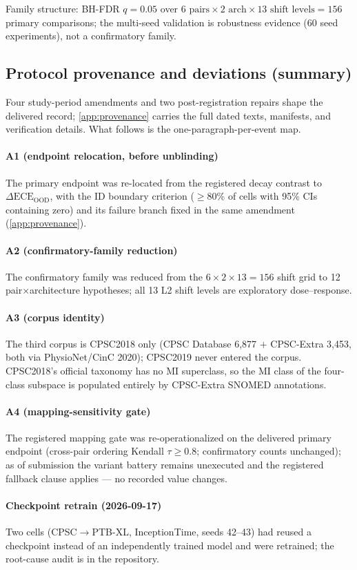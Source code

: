 \documentclass[review,12pt,nonatbib]{elsarticle}
\begin{document}
Family structure: BH-FDR $q=0.05$ over $6\text{ pairs}\times 2\text{ arch}\times 13\text{ shift levels}=156$
primary comparisons; the multi-seed validation is robustness evidence
(60 seed experiments), not a confirmatory family.

\subsection{Protocol provenance and deviations (summary)}
\label{sec:provenance-summary}
Four study-period amendments and two post-registration repairs shape the
delivered record; \ref{app:provenance} carries the full dated
texts, manifests, and verification details. What follows is the
one-paragraph-per-event map.
\paragraph{A1 (endpoint relocation, before unblinding)} The primary
endpoint was re-located from the registered decay contrast to
$\Delta\text{ECE}_{\text{OOD}}$, with the ID boundary criterion
($\geq$80\% of cells with 95\% CIs containing zero) and its failure
branch fixed in the same amendment (\ref{app:provenance}).
\paragraph{A2 (confirmatory-family reduction)} The confirmatory family
was reduced from the $6\times2\times13=156$ shift grid to 12
pair$\times$architecture hypotheses; all 13 L2 shift levels are
exploratory dose--response.
\paragraph{A3 (corpus identity)} The third corpus is CPSC2018 only
(CPSC Database 6,877 $+$ CPSC-Extra 3,453, both via PhysioNet/CinC
2020); CPSC2019 never entered the corpus. CPSC2018's official taxonomy
has no MI superclass, so the MI class of the four-class subspace is
populated entirely by CPSC-Extra SNOMED annotations.
\paragraph{A4 (mapping-sensitivity gate)} The registered mapping gate
was re-operationalized on the delivered primary endpoint (cross-pair
ordering Kendall $\tau \geq 0.8$; confirmatory counts unchanged); as of
submission the variant battery remains unexecuted and the registered
fallback clause applies --- no recorded value changes.
\paragraph{Checkpoint retrain (2026-09-17)} Two cells
(CPSC$\rightarrow$PTB-XL, InceptionTime, seeds 42--43) had reused a
checkpoint instead of an independently trained model and were retrained;
the root-cause audit is in the repository.
\end{document}
